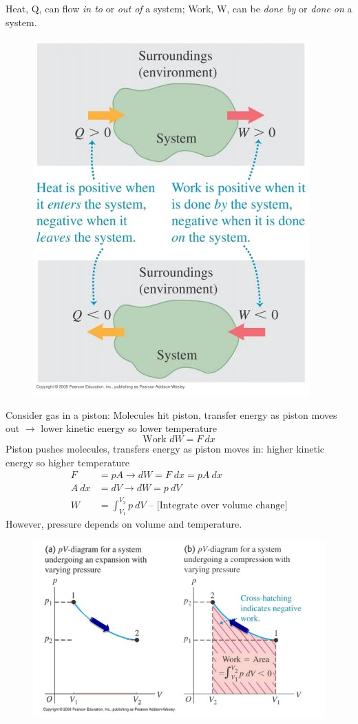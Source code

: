 \documentclass[a4paper, 11pt, normalem]{report}
\begin{document}
Heat, Q, can flow \emph{in to} or \emph{out of} a system; Work, W, can be \emph{done by} or \emph{done on} a system.
\begin{figure}[H]
    \centering
    \includegraphics{ThermoSystem.jpg}
\end{figure}
Consider gas in a piston:
Molecules hit piston, transfer energy as piston moves out $\rightarrow$ lower kinetic energy so lower temperature
\begin{equation}
	\text{Work } dW = F\:dx
\end{equation}
Piston pushes molecules, transfers energy as piston moves in: higher kinetic energy so higher temperature
\begin{align}
    F &= pA \rightarrow dW = F\;dx = pA\:dx \\
    A\:dx &= dV \rightarrow dW = p\:dV \\
    W &= \int_{V_{1}}^{V_{2}} p\:dV \text{ -- [Integrate over volume change]}
\end{align}
However, pressure depends on volume and temperature.
\begin{figure}[H]
    \centering
    \includegraphics[scale=0.8]{pV.jpg}
\end{figure}
\end{document}
